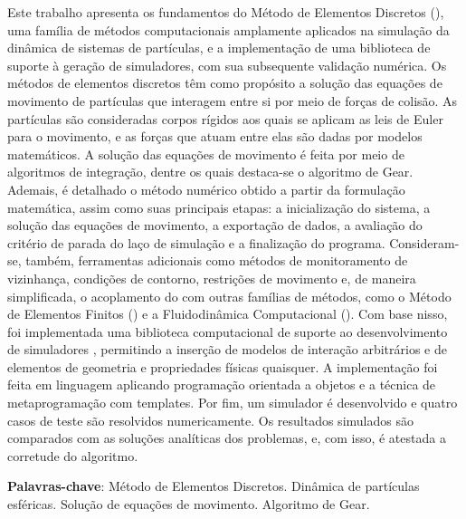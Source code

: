 \setlength{\absparsep}{18pt} %
\begin{resumo}
	Este trabalho apresenta os fundamentos do Método de Elementos Discretos (\DEM{}), uma família de métodos computacionais amplamente aplicados na simulação da dinâmica de sistemas de partículas, e a implementação de uma biblioteca de suporte à geração de simuladores, com sua subsequente validação numérica. Os métodos de elementos discretos têm como propósito a solução das equações de movimento de partículas que interagem entre si por meio de forças de colisão. As partículas são consideradas corpos rígidos aos quais se aplicam as leis de Euler para o movimento, e as forças que atuam entre elas são dadas por modelos matemáticos. A solução das equações de movimento é feita por meio de algoritmos de integração, dentre os quais destaca-se o algoritmo de Gear. Ademais, é detalhado o método numérico obtido a partir da formulação matemática, assim como suas principais etapas: a inicialização do sistema, a solução das equações de movimento, a exportação de dados, a avaliação do critério de parada do laço de simulação e a finalização do programa. Consideram-se, também, ferramentas adicionais como métodos de monitoramento de vizinhança, condições de contorno, restrições de movimento e, de maneira simplificada, o acoplamento do \DEM{} com outras famílias de métodos, como o Método de Elementos Finitos (\FEM{}) e a Fluidodinâmica Computacional (\CFD{}). Com base nisso, foi implementada uma biblioteca computacional de suporte ao desenvolvimento de simuladores \DEM{}, permitindo a inserção de modelos de interação arbitrários e de elementos de geometria e propriedades físicas quaisquer. A implementação foi feita em linguagem \CPP{} aplicando programação orientada a objetos e a técnica de metaprogramação com templates. Por fim, um simulador é desenvolvido e quatro casos de teste são resolvidos numericamente. Os resultados simulados são comparados com as soluções analíticas dos problemas, e, com isso, é atestada a corretude do algoritmo.

   \vspace{\onelineskip}
 
   \noindent 
   \textbf{Palavras-chave}: Método de Elementos Discretos. Dinâmica de partículas esféricas. Solução de equações de movimento. Algoritmo de Gear.
\end{resumo}

